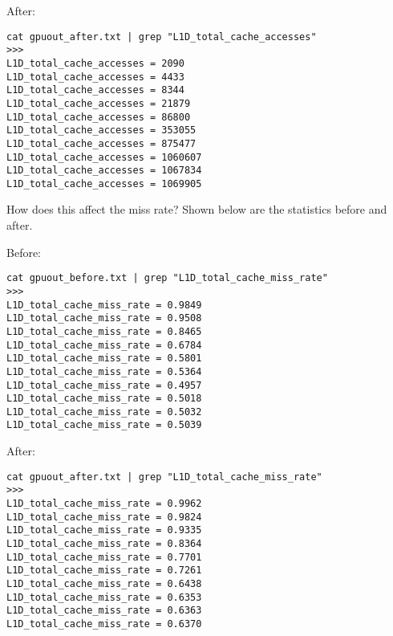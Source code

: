 \documentclass{article}
\begin{document}
After:
\begin{verbatim}
cat gpuout_after.txt | grep "L1D_total_cache_accesses"
>>>
L1D_total_cache_accesses = 2090
L1D_total_cache_accesses = 4433
L1D_total_cache_accesses = 8344
L1D_total_cache_accesses = 21879
L1D_total_cache_accesses = 86800
L1D_total_cache_accesses = 353055
L1D_total_cache_accesses = 875477
L1D_total_cache_accesses = 1060607
L1D_total_cache_accesses = 1067834
L1D_total_cache_accesses = 1069905
\end{verbatim}

How does this affect the miss rate? Shown below are the statistics before and after. 

Before:
\begin{verbatim}
cat gpuout_before.txt | grep "L1D_total_cache_miss_rate"
>>>
L1D_total_cache_miss_rate = 0.9849
L1D_total_cache_miss_rate = 0.9508
L1D_total_cache_miss_rate = 0.8465
L1D_total_cache_miss_rate = 0.6784
L1D_total_cache_miss_rate = 0.5801
L1D_total_cache_miss_rate = 0.5364
L1D_total_cache_miss_rate = 0.4957
L1D_total_cache_miss_rate = 0.5018
L1D_total_cache_miss_rate = 0.5032
L1D_total_cache_miss_rate = 0.5039
\end{verbatim}

After:
\begin{verbatim}
cat gpuout_after.txt | grep "L1D_total_cache_miss_rate"
>>>
L1D_total_cache_miss_rate = 0.9962
L1D_total_cache_miss_rate = 0.9824
L1D_total_cache_miss_rate = 0.9335
L1D_total_cache_miss_rate = 0.8364
L1D_total_cache_miss_rate = 0.7701
L1D_total_cache_miss_rate = 0.7261
L1D_total_cache_miss_rate = 0.6438
L1D_total_cache_miss_rate = 0.6353
L1D_total_cache_miss_rate = 0.6363
L1D_total_cache_miss_rate = 0.6370
\end{verbatim}


\end{document}
